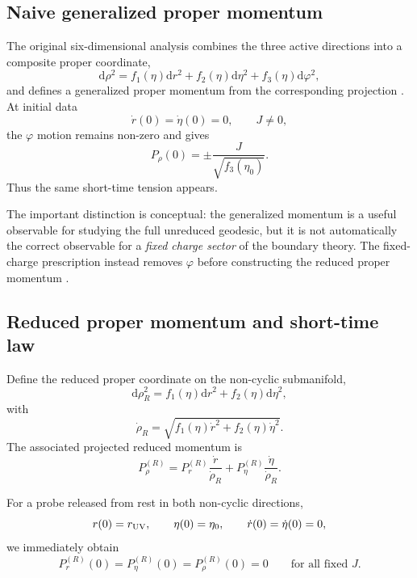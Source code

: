 \documentclass[11pt,a4paper]{article}
\theoremstyle{plain}
\theoremstyle{definition}
\theoremstyle{remark}
\newcommand{\PrR}{P_r^{(R)}}
\newcommand{\PetaR}{P_\eta^{(R)}}
\newcommand{\PrhoR}{P_\rho^{(R)}}
\begin{document}
\subsection{Naive generalized proper momentum}

The original six-dimensional analysis combines the three active directions into a composite proper coordinate,
\begin{equation*}
\mathrm d\rho^2
=
f_1(\eta)\mathrm d r^2
+
f_2(\eta)\mathrm d\eta^2
+
f_3(\eta)\mathrm d\varphi^2,
\end{equation*}
and defines a generalized proper momentum from the corresponding projection \cite{Fatemiabhari:2026rob}. At initial data
\begin{equation*}
\dot r(0)=\dot\eta(0)=0,
\qquad
J\neq0,
\end{equation*}
the $\varphi$ motion remains non-zero and gives
\begin{equation*}
\boxed{
P_\rho(0)
=
\pm\frac{J}{\sqrt{f_3(\eta_0)}}.
}
\end{equation*}
Thus the same short-time tension appears.

The important distinction is conceptual: the generalized momentum is a useful observable for studying the full unreduced geodesic, but it is not automatically the correct observable for a \emph{fixed charge sector} of the boundary theory. The fixed-charge prescription instead removes $\varphi$ before constructing the reduced proper momentum \cite{Chatzis:2026ekd}.

\subsection{Reduced proper momentum and short-time law}

Define the reduced proper coordinate on the non-cyclic submanifold,
\begin{equation*}
\mathrm d\rho_R^2
=
f_1(\eta)\mathrm d r^2
+
f_2(\eta)\mathrm d\eta^2,
\end{equation*}
with
\begin{equation*}
\dot\rho_R
=
\sqrt{
f_1(\eta)\dot r^2
+
f_2(\eta)\dot\eta^2
}.
\end{equation*}
The associated projected reduced momentum is
\begin{equation*}
\PrhoR
=
\PrR\frac{\dot r}{\dot\rho_R}
+
\PetaR\frac{\dot\eta}{\dot\rho_R}.
\end{equation*}

For a probe released from rest in both non-cyclic directions,
\begin{equation*}
r(0)=r_{\rm UV},\qquad
\eta(0)=\eta_0,\qquad
\dot r(0)=\dot\eta(0)=0,
\end{equation*}
we immediately obtain
\begin{equation*}
\PrR(0)=\PetaR(0)=\PrhoR(0)=0
\qquad
\text{for all fixed }J.
\end{equation*}
\end{document}
